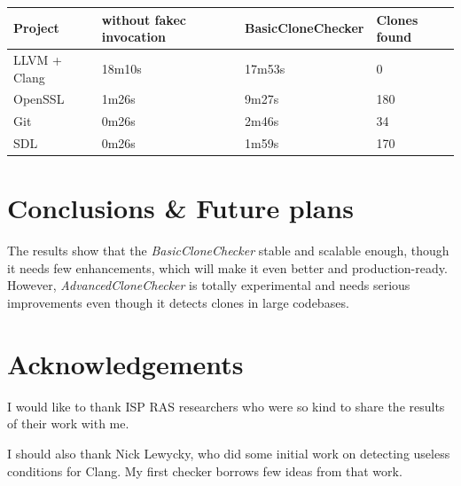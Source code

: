 \documentclass[a0,portrait]{a0poster}
\begin{document}
\begin{multicols}{2}
\begin{center}\vspace{1cm}
\begin{tabular}{l l l l}
\toprule
\textbf{Project} & \textbf{without fakec invocation} & 
\textbf{BasicCloneChecker} & \textbf{Clones found} \\
\midrule
LLVM + Clang & 18m10s & 17m53s & 0 \\
OpenSSL & 1m26s & 9m27s & 180 \\
Git & 0m26s & 2m46s & 34 \\
SDL & 0m26s & 1m59s & 170 \\
\bottomrule
\end{tabular}
\end{center}\vspace{1cm}


\section*{Conclusions \& Future plans}

The results show that the \textit{BasicCloneChecker} stable and scalable enough, though
it needs few enhancements, which will make it even better and production-ready. However,
\textit{AdvancedCloneChecker} is totally experimental and needs serious improvements
even though it detects clones in large codebases.


\nocite{*}



\section*{Acknowledgements}

I would like to thank ISP RAS researchers who were so kind to share the results of their
work with me.

I should also thank Nick Lewycky, who did some initial work on detecting useless
conditions for Clang. My first checker borrows few ideas from that work.


\end{multicols}
\end{document}
